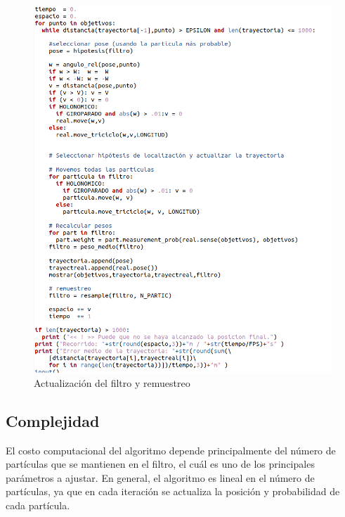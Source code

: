 \begin{figure}[htb]
  \centering
  \includegraphics[width=.9\linewidth]{images/filtroc5.png}
  \caption{Actualización del filtro y remuestreo}
  \label{fig:actualizacion}
\end{figure}

\subsection{Complejidad}
El costo computacional del algoritmo depende principalmente del número de partículas que se mantienen en el filtro, el cuál es uno de los principales
parámetros a ajustar. En general, el algoritmo es lineal en el número de partículas, ya que en cada iteración se actualiza la posición y probabilidad de cada partícula.


